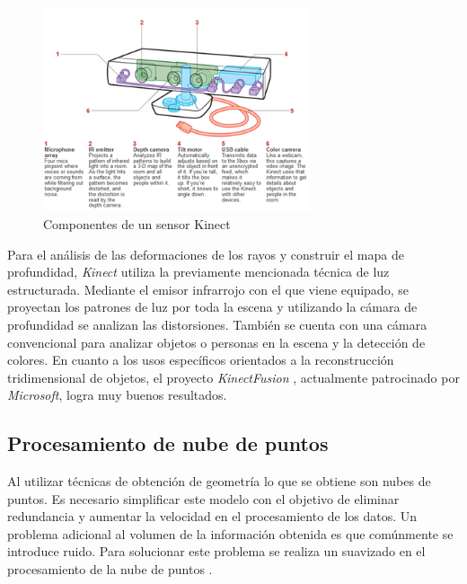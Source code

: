 \begin{figure}[H]
  \centering
    \includegraphics[width=0.7\textwidth]{./Cap2_videomapping/kinect.PNG}
  \caption{Componentes de un sensor Kinect}%
  \label{fig:Kinect}
\end{figure}

Para el análisis de las deformaciones de los rayos y construir el mapa de profundidad, \emph{Kinect} utiliza la previamente mencionada técnica de luz estructurada. Mediante el emisor infrarrojo con el que viene equipado, se proyectan los patrones de luz por toda la escena y utilizando la cámara de profundidad se analizan las distorsiones.
También se cuenta con una cámara convencional para analizar objetos o personas en la escena y la detección de colores.
En cuanto a los usos específicos orientados a la reconstrucción tridimensional de objetos, el proyecto \emph{KinectFusion} \cite{KinectFusion}, actualmente patrocinado por \emph{Microsoft}, logra muy buenos resultados.%

\subsection{Procesamiento de nube de puntos}

Al utilizar técnicas de obtención de geometría lo que se obtiene son nubes de puntos. Es necesario simplificar este modelo con el objetivo de eliminar redundancia y aumentar la velocidad en el procesamiento de los datos. Un problema adicional al volumen de la información obtenida es que comúnmente se introduce ruido. Para solucionar este problema se realiza un suavizado en el procesamiento de la nube de puntos \cite{PCloudSimplify}.

